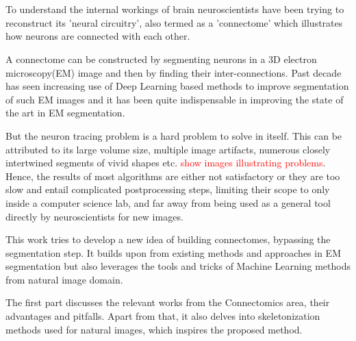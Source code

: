 \chapter{\abstractname}

To understand the internal workings of brain neuroscientists have been trying to reconstruct its 'neural circuitry', also termed as a 'connectome' which illustrates how neurons are connected with each other. 

A connectome can be constructed by segmenting neurons in a 3D electron microscopy(EM) image and then by finding their inter-connections. Past decade has seen increasing use of Deep Learning based methods to improve segmentation of such EM images and it has been quite indispensable in improving the state of the art in EM segmentation. 

But the neuron tracing problem is a hard problem to solve in itself. This can be attributed to its large volume size, multiple image artifacts, numerous closely intertwined segments of vivid shapes etc. \textcolor{red}{show images illustrating problems}. Hence, the results of most algorithms are either not satisfactory or they are too slow and entail complicated postprocessing steps, limiting their scope to only inside a computer science lab, and far away from being used as a general tool directly by neuroscientists for new images.

This work tries to develop a new idea of building connectomes, bypassing the segmentation step. It builds upon from existing methods and approaches in EM segmentation but also leverages the tools and tricks of Machine Learning methods from natural image domain. 

The first part discusses the relevant works from the Connectomics area, their advantages and pitfalls. Apart from that, it also delves into skeletonization methods used for natural images, which inspires the
proposed method.








